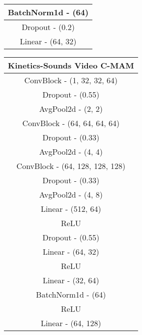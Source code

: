 \begin{table}[h!]
\begin{minipage}[t]{0.30\textwidth}
\begin{tabular}{|clllll|}
        \multicolumn{6}{c}{BatchNorm1d - (64)} \\ \hline
        \multicolumn{6}{c}{Dropout - (0.2)} \\ \hline
        \multicolumn{6}{c}{Linear - (64, 32)} \\ \hline
        \end{tabular}
    \end{minipage}%
    \hfill
    \centering
    \begin{minipage}[t]{0.2\textwidth}
    \centering
    \vspace{0pt} %
        \begin{tabular}{|clllll|}
        \hline
        \multicolumn{6}{c}{\textbf{Kinetics-Sounds Video C-MAM}} \\ \hline
        \multicolumn{6}{c}{ConvBlock - (1, 32, 32, 64)}    \\ \hline
        \multicolumn{6}{c}{Dropout - (0.55)}                \\ \hline
        \multicolumn{6}{c}{AvgPool2d - (2, 2)}              \\ \hline
        \multicolumn{6}{c}{ConvBlock - (64, 64, 64, 64)}    \\ \hline
        \multicolumn{6}{c}{Dropout - (0.33)}                \\ \hline
        \multicolumn{6}{c}{AvgPool2d - (4, 4)}              \\ \hline
        \multicolumn{6}{c}{ConvBlock - (64, 128, 128, 128)} \\ \hline
        \multicolumn{6}{c}{Dropout - (0.33)}                \\ \hline
        \multicolumn{6}{c}{AvgPool2d - (4, 8)}              \\ \hline
        \multicolumn{6}{c}{Linear - (512, 64)}              \\ \hline
        \multicolumn{6}{c}{ReLU}                            \\ \hline
        \multicolumn{6}{c}{Dropout - (0.55)}                \\ \hline
        \multicolumn{6}{c}{Linear - (64, 32)}               \\ \hline
        \multicolumn{6}{c}{ReLU}               \\ \hline
        \multicolumn{6}{c}{Linear - (32, 64)}               \\ \hline
        \multicolumn{6}{c}{BatchNorm1d - (64)}               \\ \hline
        \multicolumn{6}{c}{ReLU}               \\ \hline
        \multicolumn{6}{c}{Linear - (64, 128)}               \\ \hline
        \end{tabular}
    \end{minipage}%
    \hfill
\end{table}
